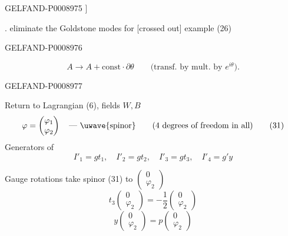 \begin{GelfandAdjacentEvidence}{GELFAND-P000897}{5}
]

. eliminate the Goldstone modes for [crossed out] example (26)
\end{GelfandAdjacentEvidence}
\begin{GelfandAdjacentEvidence}{GELFAND-P000897}{6}

\[
A\to A+\mathrm{const}\cdot\partial\theta
\qquad\text{(transf. by mult. by }e^{i\theta}\text{).}
\]
\end{GelfandAdjacentEvidence}
\begin{GelfandAdjacentEvidence}{GELFAND-P000897}{7}


Return to Lagrangian (6), fields $W,B$
\begin{equation*}
\varphi=\begin{pmatrix}\varphi_1\\\varphi_2\end{pmatrix}
\quad\text{— \uwave{spinor}}
\qquad\text{(4 degrees of freedom in all)} \tag{31}
\end{equation*}
Generators of 
\begin{equation*}
I'_1=gt_1,\quad I'_2=gt_2,\quad I'_3=gt_3,\quad I'_4=g'y \tag{32}
\end{equation*}

Gauge rotations take spinor (31) to $\begin{pmatrix}0\\\varphi_2\end{pmatrix}$
\[
t_3\begin{pmatrix}0\\\varphi_2\end{pmatrix}
=-\frac12\begin{pmatrix}0\\\varphi_2\end{pmatrix}
\]
\[
y\begin{pmatrix}0\\\varphi_2\end{pmatrix}
=p\begin{pmatrix}0\\\varphi_2\end{pmatrix}
\]
\end{GelfandAdjacentEvidence}
